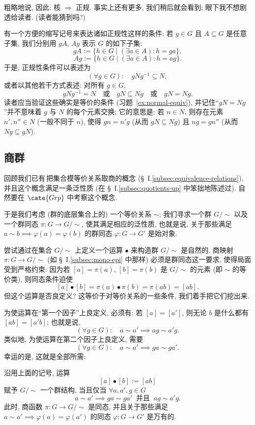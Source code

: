 粗略地说, 因此: 核 $\Longrightarrow$ 正规. 事实上还有更多, 我们稍后就会看到; 眼下我不想剧透给读者. (读者能猜到吗?)

有一个方便的缩写记号来表达诸如正规性这样的条件: 若 $g \in G$ 且 $A \subseteq G$ 是任意子集, 我们分别用 $gA$, $Ag$ 表示 $G$ 的如下子集:
\[
gA := \{h \in G \mid (\exists a \in A): h = ga\},
\]
\[
Ag := \{h \in G \mid (\exists a \in A): h = ag\}.
\]
于是, 正规性条件可以表述为
\[
(\forall g \in G): \quad gNg^{-1} \subseteq N,
\]
或者以其他若干方式表述: 对所有 $g \in G$,
\[
gNg^{-1} = N \quad \text{或} \quad gN \subseteq Ng \quad \text{或} \quad gN = Ng.
\]
读者应当验证这些确实是等价的条件 (习题~\ref{ex:normal-equiv}), 并记住``$gN = Ng$''并不意味着 $g$ 与 $N$ 的每个元素交换; 它的意思是: 若 $n \in N$, 则存在元素 $n', n'' \in N$ (一般不同于 $n$), 使得 $gn = n'g$ (从而 $gN \subseteq Ng$) 且 $ng = gn''$ (从而 $Ng \subseteq gN$).

\subsection{商群}
\label{subsec:quotient-group}

回顾我们已有\,把集合模等价关系取商的概念 (\S~I.\ref{subsec:equivalence-relations}), 并且这个概念满足一条泛性质 (在 \S~I.\ref{subsec:quotients-up} 中笨拙地陈述过). 自然要在 $\cate{Grp}$ 中考察这个概念.

于是我们考虑 (群的底层集合上的) 一个等价关系 $\sim$; 我们寻求一个群 $G/{\sim}$ 以及一个群同态 $\pi : G \to G/{\sim}$, 使其满足相应的泛性质, 也就是说, 关于那些满足 $a \sim b \implies \varphi(a) = \varphi(b)$ 的群同态 $\varphi : G \to G'$ 是始对象.

尝试通过在集合 $G/{\sim}$ 上定义一个运算 $\bullet$ 来构造群 $G/{\sim}$ 是自然的. 商映射 $\pi : G \to G/{\sim}$ (如 \S~I.\ref{subsec:mono-epi} 中那样) 必须是群同态这一要求, 使得局面受到严格约束: 因为若 $[a] = \pi(a)$, $[b] = \pi(b)$ 是 $G/{\sim}$ 的元素 (即 $\sim$ 的等价类), 则同态条件迫使
\[
[a] \bullet [b] = \pi(a) \bullet \pi(b) = \pi(ab) = [ab].
\]
但这个运算是否良定义? 这等价于对等价关系的一些条件, 我们着手把它们挖出来.

为使运算在``第一个因子''上良定义, 必须有: 若 $[a] = [a']$, 则无论 $b$ 是什么都有 $[ab] = [a'b]$; 也就是说,
\[
(\forall g \in G): \quad a \sim a' \implies ag \sim a'g.
\]
类似地, 为使运算在第二个因子上良定义, 需要
\[
(\forall g \in G): \quad a \sim a' \implies ga \sim ga'.
\]
幸运的是, 这就是全部所需:

\begin{proposition}
\label{prop:quotient-operation}
沿用上面的记号, 运算
\[
[a] \bullet [b] := [ab]
\]
赋予 $G/{\sim}$ 一个群结构, 当且仅当 $\forall a, a', g \in G$
\[
a \sim a' \implies ga \sim ga' \ \text{ 并且 } \ ag \sim a'g.
\]
此时, 商函数 $\pi : G \to G/{\sim}$ 是同态, 并且关于那些满足 $a \sim a' \implies \varphi(a) = \varphi(a')$ 的同态 $\varphi : G \to G'$ 是万有的.
\end{proposition}


